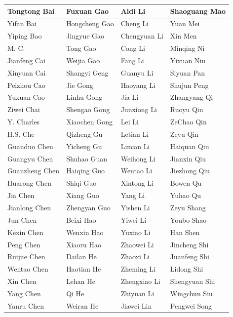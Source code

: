 \documentclass[
  10
]{article}
\newcounter{none} %
\begin{document}
{\def\LTcaptype{none} %
\begin{longtable}[]{@{}|l|l|l|l|@{}}
\toprule\noalign{}
\endhead
\bottomrule\noalign{}
\endlastfoot
\hline
Tongtong Bai & Fuxuan Gao & Aidi Li & Shaoguang Mao \\
\hline
Yifan Bai & Hongcheng Gao & Cheng Li & Yuan Mei \\
\hline
Yiping Bao & Jingyue Gao & Chengyuan Li & Xin Men \\
\hline
M. C. & Tong Gao & Cong Li & Minqing Ni \\
\hline
Jianfeng Cai & Weijia Gao & Fang Li & Yixuan Niu \\
\hline
Xinyuan Cai & Shangyi Geng & Guanyu Li & Siyuan Pan \\
\hline
Peizhou Cao & Jie Gong & Haoyang Li & Shujun Peng \\
\hline
Yuxuan Cao & Linhu Gong & Jia Li & Zhangyang Qi \\
\hline
Ziwei Chai & Shengao Gong & Junxiong Li & Ruoyu Qin \\
\hline
Y. Charles & Xiaochen Gong & Lei Li & ZeChao Qin \\
\hline
H.S. Che & Qizheng Gu & Letian Li & Zeyu Qin \\
\hline
Guanduo Chen & Yicheng Gu & Lincan Li & Haiquan Qiu \\
\hline
Guangyu Chen & Shuhao Guan & Weihong Li & Jianxin Qiu \\
\hline
Guanzheng Chen & Haiqing Guo & Wentao Li & Jiezhong Qiu \\
\hline
Huarong Chen & Shiqi Guo & Xintong Li & Bowen Qu \\
\hline
Jia Chen & Xiang Guo & Yang Li & Yuhao Qu \\
\hline
Jianlong Chen & Zhengyan Guo & Yishen Li & Zeyu Shang \\
\hline
Jun Chen & Beixi Hao & Yiwei Li & Youbo Shao \\
\hline
Kexin Chen & Wenxin Hao & Yuxiao Li & Han Shen \\
\hline
Peng Chen & Xiaoru Hao & Zhaowei Li & Jincheng Shi \\
\hline
Ruijue Chen & Dailan He & Zhaoxi Li & Juanfeng Shi \\
\hline
Wentao Chen & Haotian He & Zheming Li & Lidong Shi \\
\hline
Xin Chen & Lehan He & Zhengxiao Li & Shengyuan Shi \\
\hline
Yang Chen & Qi He & Zhiyuan Li & Wingchun Siu \\
\hline
Yanru Chen & Weiran He & Jiawei Lin & Pengwei Song \\

\end{longtable}}
\end{document}
